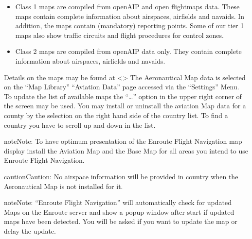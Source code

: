 \documentclass[letterpaper,10pt,english]{sphinxmanual}
\begin{document}
\begin{itemize}
\item {} 
Class 1 maps are compiled from openAIP and open flightmaps data. These maps contain complete information about airspaces, airfields and navaids. In addition, the maps contain (mandatory) reporting points. Some of our tier 1 maps also show traffic circuits and flight procedures for control zones.

\item {} 
Class 2 maps are compiled from openAIP data only. They contain complete information about airspaces, airfields and navaids.

\end{itemize}

Details on the maps may be found at \textless{}\textgreater{}
The Aeronautical Map data is selected on the “Map Library” \textendash{} “Aviation Data” page accessed via the “Settings” Menu.
To update the list of available maps the “…” option in the upper right corner of the screen may be used.
You may install or uninstall the aviation Map data for a county by the selection on the right hand side of the country list. To find a country you have to scroll up and down in the list.

\begin{sphinxadmonition}{note}{Note:}
To have optimum presentation of the Enroute Flight Navigation map display install the Aviation Map and the Base Map for all areas you intend to use Enroute Flight Navigation.
\end{sphinxadmonition}

\begin{sphinxadmonition}{caution}{Caution:}
No airspace information will be provided in country when the Aeronautical Map is not installed for it.
\end{sphinxadmonition}

\begin{sphinxadmonition}{note}{Note:}
“Enroute Flight Navigation” will automatically check for updated Maps on the Enroute server and show a pop\sphinxhyphen{}up window after start if updated maps have been detected.
You will be asked if you want to update the map or delay the update.
\end{sphinxadmonition}

\end{document}
